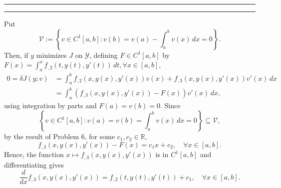 \documentclass[11pt]{article}
\newcounter{questionCounter}
\newcounter{partCounter}[questionCounter]
\newenvironment{question}[2][\arabic{questionCounter}]{%
    \setcounter{partCounter}{0}%
    \vspace{.25in} \hrule \vspace{0.5em}%
        \noindent{\bf #2}%
    \vspace{0.8em} \hrule \vspace{.10in}%
    \addtocounter{questionCounter}{1}%
}{}
\newcommand{\R}{\mathbb{R}}             %
\newcommand{\Y}{\mathscr{Y}}            %
\newcommand{\V}{\mathscr{V}}            %
\begin{document}
\begin{question}{Problem 7}
Put
\[\V := \left\{ v \in C^1[a,b] :
                             v(b) = v(a) - \int_a^b v(x) \, dx = 0 \right\}.\]
Then, if $y$ minimizes $J$ on $\Y$, defining $F \in C^1[a,b]$ by
$F(x) = \int_a^x f_{,2}(t,y(t),y'(t)) \, dt, \forall x \in [a,b]$,
\begin{align*}
0
    = \delta J(y;v)
 &  = \int_a^b f_{,2}(x,y(x),y'(x))v(x) + f_{,3}(x,y(x),y'(x))v'(x) \, dx   \\
 &  = \int_a^b \left( f_{,3}(x,y(x),y'(x)) - F(x) \right)v'(x) \, dx,
\end{align*}
using integration by parts and $F(a) = v(b) = 0$. Since
\[\left\{v \in C^1[a,b] : v(a) = v(b) = \int_a^b v(x) \, dx = 0\right\}
    \subseteq \V,\]
by the result of Problem 6, for some $c_1,c_2 \in \R$,
\[f_{,3}(x,y(x),y'(x)) - F(x) = c_1x + c_2, \quad \forall x \in [a,b].\]
Hence, the function $x \mapsto f_{,3}(x,y(x),y'(x))$ is in $C^1[a,b]$ and
differentiating gives
\[\frac{d}{dx} f_{,3}(x,y(x),y'(x)) = f_{,2}(t,y(t),y'(t))
    + c_1, \quad \forall x \in [a,b].\]
\end{question}
%
\end{document}
